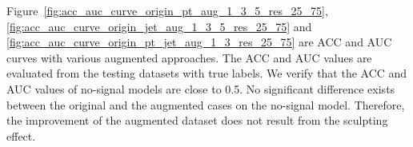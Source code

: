\documentclass[12pt]{article}
\begin{document}
		Figure~\ref{fig:acc_auc_curve_origin_pt_aug_1_3_5_res_25_75}, \ref{fig:acc_auc_curve_origin_jet_aug_1_3_5_res_25_75} and \ref{fig:acc_auc_curve_origin_pt_jet_aug_1_3_res_25_75} are ACC and AUC curves with various augmented approaches. The ACC and AUC values are evaluated from the testing datasets with true labels. We verify that the ACC and AUC values of no-signal models are close to 0.5. No significant difference exists between the original and the augmented cases on the no-signal model. Therefore, the improvement of the augmented dataset does not result from the sculpting effect.
		\begin{figure}[htpb]
			\centering
			 \\
\end{figure}
\end{document}
